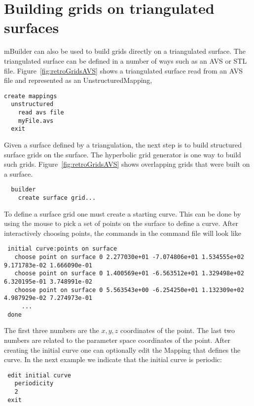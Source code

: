 % 



\clearpage
\section{Building grids on triangulated surfaces}\label{sec:retroTriangles}



mBuilder can also be used to build grids directly on a triangulated surface. The triangulated
surface can be defined in a number of ways such as an AVS or STL file.
Figure~\ref{fig:retroGridsAVS} shows a triangulated surface read from an AVS file and
represented as an UnstructuredMapping, 
\begin{verbatim}
create mappings
  unstructured 
    read avs file 
    myFile.avs 
  exit
\end{verbatim}
Given a surface defined by a triangulation,
the next step is to build structured surface grids on the surface. The hyperbolic
grid generator is one way to build such grids. 
Figure~\ref{fig:retroGridsAVS} shows overlapping grids that were built on a surface.
\begin{verbatim}
  builder 
    create surface grid...
\end{verbatim}
To define a surface grid one must create a starting curve. This can be done by
using the mouse to pick a set of points on the surface to define a curve.
After interactively choosing points, the commands in the command file will look like
{\footnotesize
\begin{verbatim}
 initial curve:points on surface
   choose point on surface 0 2.277030e+01 -7.074806e+01 1.534555e+02 9.171783e-02 1.666090e-01
   choose point on surface 0 1.400569e+01 -6.563512e+01 1.329498e+02 6.320195e-01 3.748991e-02
   choose point on surface 0 5.563543e+00 -6.254250e+01 1.132309e+02 4.987929e-02 7.274973e-01
     ...
 done
\end{verbatim}
}
The first three numbers are the $x,y,z$ coordinates of the point. The last two numbers are
related to the parameter space coordinates of the point.
After creating the initial curve one can optionally edit the Mapping that
defines the curve. In the next example we indicate that the initial curve is
periodic:
\begin{verbatim}
 edit initial curve
   periodicity
   2
 exit
\end{verbatim}
